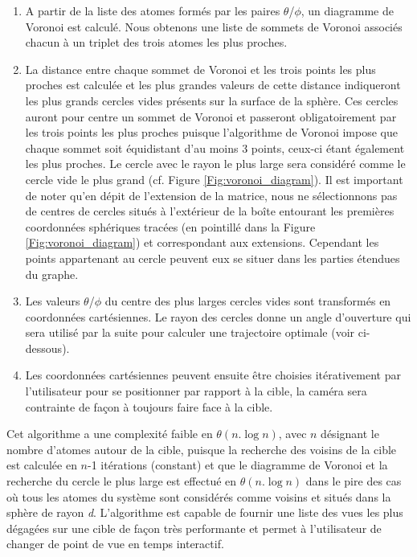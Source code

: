 \begin{enumerate}
	\item A partir de la liste des atomes formés par les paires $\theta$/$\phi$, un diagramme de Voronoi est calculé. Nous obtenons une liste de sommets de Voronoi associés chacun à un triplet des trois atomes les plus proches.
	\item La distance entre chaque sommet de Voronoi et les trois points les plus proches est calculée et les plus grandes valeurs de cette distance indiqueront les plus grands cercles vides présents sur la surface de la sphère. Ces cercles auront pour centre un sommet de Voronoi et passeront obligatoirement par les trois points les plus proches puisque l'algorithme de Voronoi impose que chaque sommet soit équidistant d'au moins 3 points, ceux-ci étant également les plus proches. Le cercle avec le rayon le plus large sera considéré comme le cercle vide le plus grand (cf. Figure \ref{Fig:voronoi_diagram}). Il est important de noter qu'en dépit de l'extension de la matrice, nous ne sélectionnons pas de centres de cercles situés à l'extérieur de la boîte entourant les premières coordonnées sphériques tracées (en pointillé dans la Figure \ref{Fig:voronoi_diagram}) et correspondant aux extensions. Cependant les points appartenant au cercle peuvent eux se situer dans les parties étendues du graphe.
	\item Les valeurs $\theta$/$\phi$ du centre des plus larges cercles vides sont transformés en coordonnées cartésiennes. Le rayon des cercles donne un angle d'ouverture qui sera utilisé par la suite pour calculer une trajectoire optimale (voir ci-dessous).
	\item Les coordonnées cartésiennes peuvent ensuite être choisies itérativement par l'utilisateur pour se positionner par rapport à la cible, la caméra sera contrainte de façon à toujours faire face à la cible.
\end{enumerate}

Cet algorithme a une complexité faible en $\theta(n.\log{n})$, avec $n$ désignant le nombre d'atomes autour de la cible, puisque la recherche des voisins de la cible est calculée en $n$-1 itérations (constant) et que le diagramme de Voronoi et la recherche du cercle le plus large est effectué en $\theta(n.\log{n})$ dans le pire des cas où tous les atomes du système sont considérés comme voisins et situés dans la sphère de rayon \textit{d}. L'algorithme est capable de fournir une liste des vues les plus dégagées sur une cible de façon très performante et permet à l'utilisateur de changer de point de vue en temps interactif.

